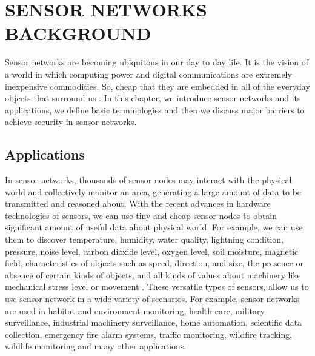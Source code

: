 \chapter{SENSOR NETWORKS BACKGROUND} 
\label{cha:Sensor Networks/Data Aggregation/Security Background}
	
	Sensor networks are becoming ubiquitous in our day to day life. 
	It is the vision of a world in which computing power and digital communications are extremely inexpensive commodities.
	So, cheap that they are embedded in all of the everyday objects that surround us \cite{2002-Stajano-ubiquitous}.	
	In this chapter, we introduce sensor networks and its applications, we define basic terminologies and then we discuss major 
	barriers to achieve security in sensor networks.

\section{Applications}
	In sensor networks, thousands of sensor nodes may interact with the physical world and collectively monitor an area, generating a large amount of data to be transmitted and reasoned about.
	With the recent advances in hardware technologies of sensors, we can use tiny and cheap sensor nodes to obtain significant amount of useful data about physical world.
	For example, we can use them to discover temperature, humidity, water quality, lightning condition, pressure, noise level, carbon dioxide level, oxygen level, soil moisture, magnetic field, characteristics of objects such as speed, direction, and size, the presence or absence of certain kinds of objects, and all kinds of values about machinery like mechanical stress level or movement \cite{hof2007applications}.
	These versatile types of sensors, allow us to use sensor network in a wide variety of scenarios.
	For example, sensor networks are used in habitat and environment monitoring, health care, military surveillance, industrial machinery surveillance, home automation, scientific data collection, emergency fire alarm systems, traffic monitoring, wildfire tracking, wildlife monitoring and many other applications.
	
